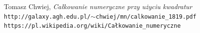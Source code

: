 \documentclass{article}
\begin{document}
\begin{thebibliography}{1}

	Tomasz Chwiej, \emph{Całkowanie numeryczne przy użyciu kwadratur} \\
	\texttt{http://galaxy.agh.edu.pl/$\sim$chwiej/mn/calkowanie\_1819.pdf}	
	\texttt{https://pl.wikipedia.org/wiki/Całkowanie\_numeryczne}
	

\end{thebibliography}
\end{document}
